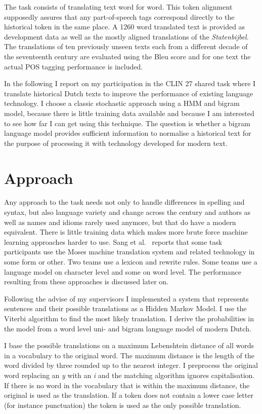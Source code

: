 \documentclass[11pt]{article}
\begin{document}
The task consists of translating text word for word. This token alignment supposedly assures that any part-of-speech tags correspond directly to the historical token in the same place. A 1260 word translated text is provided as development data as well as the mostly aligned translations of the \emph{Statenbijbel}. The translations of ten previously unseen texts each from a different decade of the seventeenth century are evaluated using the Bleu score and for one text the actual POS tagging performance is included.

In the following I report on my participation in the CLIN 27 shared task where I translate historical Dutch texts to improve the performance of existing language technology. I choose a classic stochastic approach using a HMM and bigram model, because there is little training data available and because I am interested to see how far I can get using this technique. The question is whether a bigram language model provides sufficient information to normalise a historical text for the purpose of processing it with technology developed for modern text.

\section{Approach}

Any approach to the task needs not only to handle differences in spelling and syntax, but also language variety and change across the century and authors as well as names and idioms rarely used anymore, but that do have a modern equivalent. There is little training data which makes more brute force machine learning approaches harder to use. Sang et al.~ reports that some task participants use the Moses machine translation system and related technology in some form or other. Two teams use a lexicon and rewrite rules. Some teams use a language model on character level and some on word level. The performance resulting from these approaches is discussed later on.

Following the advise of my supervisors I implemented a system that represents sentences and their possible translations as a Hidden Markov Model. I use the Viterbi algorithm to find the most likely translation. I derive the probabilities in the model from a word level uni- and bigram language model of modern Dutch.

I base the possible translations on a maximum Lebenshtein distance of all words in a vocabulary to the original word. The maximum distance is the length of the word divided by three rounded up to the nearest integer. I preprocess the original word replacing an \emph{y} with an \emph{i} and the matching algorithm ignores capitalisation. If there is no word in the vocabulary that is within the maximum distance, the original is used as the translation. If a token does not contain a lower case letter (for instance punctuation) the token is used as the only possible translation.
\end{document}
